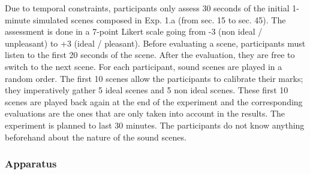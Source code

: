 \documentclass[twoside,twocolumn]{article}
\begin{document}
%
%
%

Due to temporal constraints, participants only assess 30 seconds of the initial 1-minute simulated scenes composed in Exp. 1.a (from sec. 15 to sec. 45).
The assessment is done in a 7-point Likert scale going from -3 (non ideal / unpleasant) to +3 (ideal / pleasant). Before evaluating a scene, participants must listen to the first 20 seconds of the scene. After the evaluation, they are free to switch to the next scene.
For each participant, sound scenes are played in a random order. The first 10 scenes allow the participants to calibrate their marks; they imperatively gather 5 ideal scenes and 5 non ideal scenes. These first 10 scenes are played back again at the end of the experiment and the corresponding evaluations are the ones that are only taken into account in the results.
The experiment is planned to last 30 minutes. The participants do not know anything beforehand about the nature of the sound scenes.

\subsubsection*{Apparatus}

%
%
\end{document}
